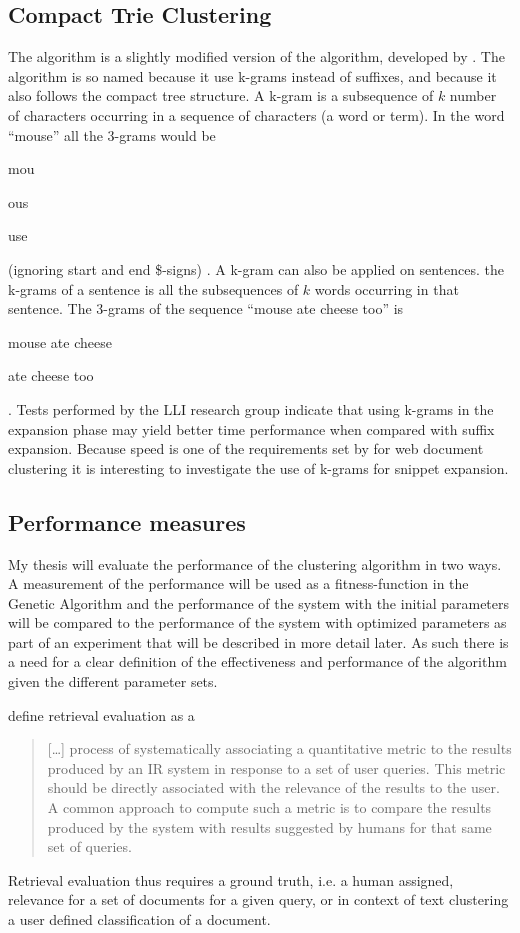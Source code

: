 \subsection{Compact Trie Clustering}
The \CTC algorithm is a slightly modified version of the \STC algorithm, developed by \supervisor. The algorithm is so named because it use k-grams instead of suffixes, and because it also follows the compact tree structure. A k-gram is a subsequence of \(k\) number of characters occurring in a sequence of characters (a word or term). In the word ``mouse'' all the 3-grams would be 
\begin{inparaenum}[(1)] 
    \item mou
    \item ous
    \item use
\end{inparaenum}
(ignoring start and end \$-signs)
\cite{Manning2009}. A k-gram can also be applied on sentences. the k-grams of a sentence is all the subsequences of \(k\) words occurring in that sentence. The 3-grams of the sequence ``mouse ate cheese too'' is
\begin{inparaenum}[(1)] 
    \item mouse ate cheese
    \item ate cheese too
\end{inparaenum}.
Tests performed by the LLI research group indicate that using k-grams in the expansion phase may yield better time performance when compared with suffix expansion. Because speed is one of the requirements set by \cite{Oren1998} for web document clustering it is interesting to investigate the use of k-grams for snippet expansion.

\subsection{Performance measures}
My thesis will evaluate the performance of the clustering algorithm in two ways. A measurement of the performance will be used as a fitness-function in the Genetic Algorithm and the performance of the system with the initial parameters will be compared to the performance of the system with optimized parameters as part of an experiment that will be described in more detail later. As such there is a need for a clear definition of the effectiveness and performance of the \CTC algorithm given the different parameter sets.

\cite[131]{Baeza-Yates2011b} define retrieval evaluation as a \begin{quote} 
[\dots] process of systematically associating a quantitative metric to the results produced by an IR system in response to a set of user queries. This metric should be directly associated with the relevance of the results to the user. A common approach to compute such a metric is to compare the results produced by the system with results suggested by humans for that same set of queries.
\end{quote}
Retrieval evaluation thus requires a ground truth, i.e. a human assigned, relevance for a set of documents for a given query, or in context of text clustering a user defined classification of a document.

